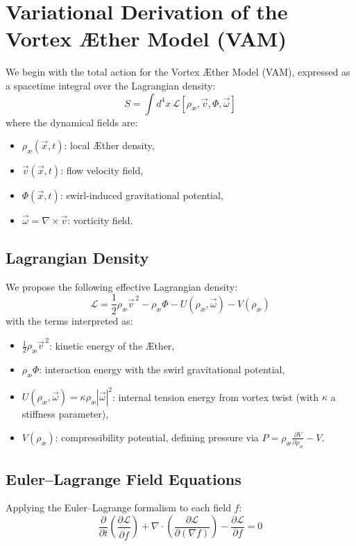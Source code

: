 \section{Variational Derivation of the Vortex \AE ther Model (VAM)}

We begin with the total action for the Vortex \AE ther Model (VAM), expressed as a spacetime integral over the Lagrangian density:
\begin{equation}
    S = \int d^4x \, \mathcal{L}[\rho_\text{\ae}, \vec{v}, \Phi, \vec{\omega}]
\end{equation}
where the dynamical fields are:
\begin{itemize}
    \item $\rho_\text{\ae}(\vec{x}, t)$: local \AE ther density,
    \item $\vec{v}(\vec{x}, t)$: flow velocity field,
    \item $\Phi(\vec{x}, t)$: swirl-induced gravitational potential,
    \item $\vec{\omega} = \nabla \times \vec{v}$: vorticity field.
\end{itemize}

\subsection*{Lagrangian Density}
We propose the following effective Lagrangian density:
\begin{equation}
    \mathcal{L} = \frac{1}{2} \rho_\text{\ae} \vec{v}^{\,2} - \rho_\text{\ae} \Phi - U(\rho_\text{\ae}, \vec{\omega}) - V(\rho_\text{\ae})
\end{equation}
with the terms interpreted as:
\begin{itemize}
    \item $\frac{1}{2} \rho_\text{\ae} \vec{v}^{\,2}$: kinetic energy of the \AE ther,
    \item $\rho_\text{\ae} \Phi$: interaction energy with the swirl gravitational potential,
    \item $U(\rho_\text{\ae}, \vec{\omega}) = \kappa \rho_\text{\ae} |\vec{\omega}|^2$: internal tension energy from vortex twist (with $\kappa$ a stiffness parameter),
    \item $V(\rho_\text{\ae})$: compressibility potential, defining pressure via $P = \rho_\text{\ae} \frac{\partial V}{\partial \rho_\text{\ae}} - V$.
\end{itemize}

\subsection*{Euler--Lagrange Field Equations}
Applying the Euler--Lagrange formalism to each field $f$:
\begin{equation}
    \frac{\partial}{\partial t} \left( \frac{\partial \mathcal{L}}{\partial \dot{f}} \right) + \nabla \cdot \left( \frac{\partial \mathcal{L}}{\partial (\nabla f)} \right) - \frac{\partial \mathcal{L}}{\partial f} = 0
\end{equation}

